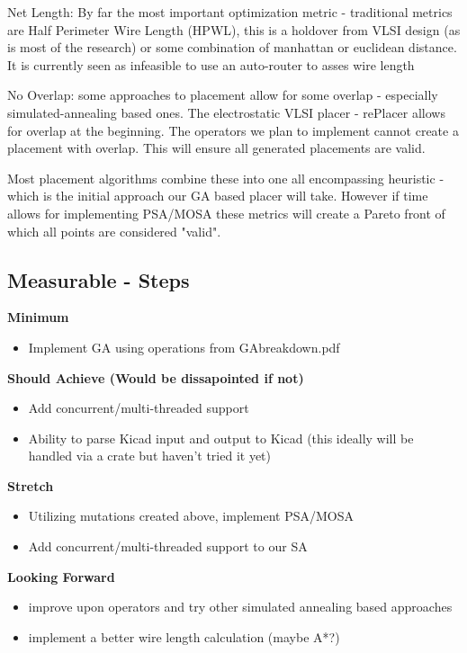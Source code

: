 \documentclass{article}
\begin{document}
Net Length: By far the most important optimization metric - traditional metrics are Half Perimeter Wire Length (HPWL), this is a holdover from VLSI design (as is most of the research) or some combination of manhattan or euclidean distance. It is currently seen as infeasible to use an auto-router to asses wire length

No Overlap: some approaches to placement allow for some overlap - especially simulated-annealing based ones. The electrostatic VLSI placer - rePlacer allows for overlap at the beginning. The operators we plan to implement cannot create a placement with overlap. This will ensure all generated placements are valid. 

Most placement algorithms combine these into one all encompassing heuristic - which is the initial approach our GA based placer will take. However if time allows for implementing PSA/MOSA these metrics will create a Pareto front of which all points are considered "valid". 

\subsection{Measurable - Steps }

\noindent\textbf{Minimum}
\begin{itemize}
    \item Implement GA using operations from GA\textunderscore breakdown.pdf  
\end{itemize}


\noindent\textbf{Should Achieve (Would be dissapointed if not)}
\begin{itemize}
    \item Add concurrent/multi-threaded support
    \item Ability to parse Kicad input and output to Kicad (this ideally will be handled via a crate but haven't tried it yet)
\end{itemize}


\noindent\textbf{Stretch}
\begin{itemize}
    \item Utilizing mutations created above, implement PSA/MOSA 
    \item Add concurrent/multi-threaded support to our SA 
\end{itemize}

\noindent\textbf{Looking Forward}
\begin{itemize}
    \item improve upon operators and try other simulated annealing based approaches
    \item implement a better wire length calculation (maybe A*?)
\end{itemize}
\end{document}
